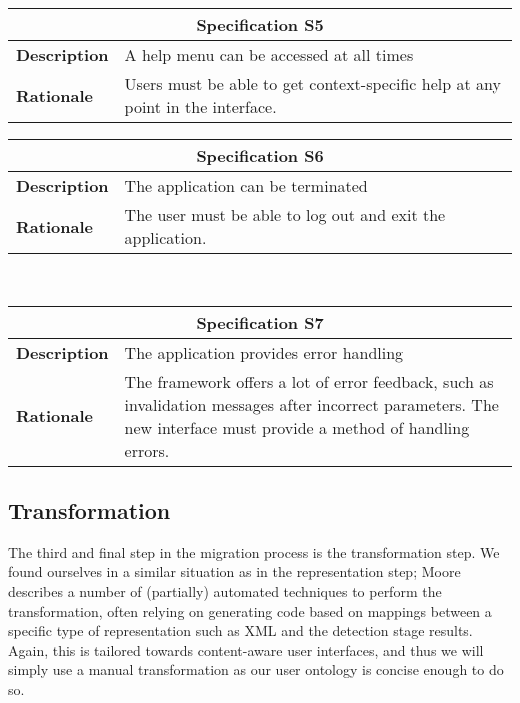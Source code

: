\begin{tabularx}{0.49\textwidth}[t]{lX}
	\toprule
	\multicolumn{2}{c}{\textbf{Specification S5}} \\
	\midrule
	\textbf{Description} & A help menu can be accessed at all times\\
	\addlinespace[0.5em]
	\textbf{Rationale}	 & Users must be able to get context-specific help at any point in the interface. \\
	\bottomrule
\end{tabularx}\hspace{0.02\textwidth}
\begin{tabularx}{0.49\textwidth}[t]{lX}
	\toprule
	\multicolumn{2}{c}{\textbf{Specification S6}} \\
	\midrule
	\textbf{Description} & The application can be terminated \\
	\addlinespace[0.5em]
	\textbf{Rationale}	 & The user must be able to log out and exit the application. \newline \\
	\bottomrule
\end{tabularx}
\\[2em]

\begin{tabularx}{0.49\textwidth}{lX}
	\toprule
	\multicolumn{2}{c}{\textbf{Specification S7}} \\
	\midrule
	\textbf{Description} & The application provides error handling \\
	\addlinespace[0.5em]
	\textbf{Rationale}	 & The framework offers a lot of error feedback, such as invalidation messages after incorrect parameters. The new interface must provide a method of handling errors. \\
	\bottomrule
\end{tabularx}

\normalsize

\subsection{Transformation}
\label{subsection:transformation}
The third and final step in the migration process is the transformation step. We found ourselves in a similar situation as in the representation step; Moore describes a number of (partially) automated techniques to perform the transformation, often relying on generating code based on mappings between a specific type of representation such as XML and the detection stage results. Again, this is tailored towards content-aware user interfaces, and thus we will simply use a manual transformation as our user ontology is concise enough to do so.


